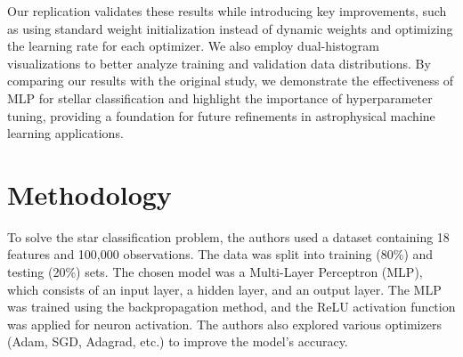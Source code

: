 \documentclass[journal,onecolumn]{IEEEtran}
\begin{document}
Our replication validates these results while introducing key improvements, such as using standard weight initialization instead of dynamic weights and optimizing the learning rate for each optimizer. We also employ dual-histogram visualizations to better analyze training and validation data distributions. By comparing our results with the original study, we demonstrate the effectiveness of MLP for stellar classification and highlight the importance of hyperparameter tuning, providing a foundation for future refinements in astrophysical machine learning applications.




%
\IEEEpeerreviewmaketitle



\section{Methodology}
% 
% 
% 
% 


To solve the star classification problem, the authors used a dataset containing 18 features and 100,000 observations. The data was split into training (80\%) and testing (20\%) sets. The chosen model was a Multi-Layer Perceptron (MLP), which consists of an input layer, a hidden layer, and an output layer. The MLP was trained using the backpropagation method, and the ReLU activation function was applied for neuron activation. The authors also explored various optimizers (Adam, SGD, Adagrad, etc.) to improve the model's accuracy.
\end{document}
